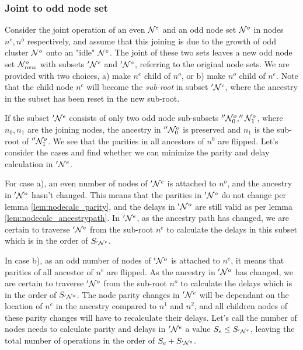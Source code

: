 \subsubsection{Joint to odd node set}

Consider the joint operation of an even $\mathcal{N}^e$ and an odd node set $\mathcal{N}^o$ in nodes $n^e, n^o$ respectively, and assume that this joining is due to the growth of odd cluster $\mathcal{N}^o$ onto an "idle" $\mathcal{N}^e$. The joint of these two sets leaves a new odd node set $\mathcal{N}_{new}^o$ with subsets $'\mathcal{N}^e$ and $'\mathcal{N}^o$, referring to the original node sets. We are provided with two choices, a) make $n^e$ child of $n^o$, or b) make $n^o$ child of $n^e$. Note that the child node $n^c$ will become the \emph{sub-root} in subset $'\mathcal{N}^c$, where the ancestry in the subset has been reset in the new sub-root.

If the subset $'\mathcal{N}^e$ consists of only two odd node sub-subsets $''\mathcal{N}^o_0, ''\mathcal{N}^o_1$, where $n_0, n_1$ are the joining nodes, the ancestry in $''\mathcal{N}^o_0$ is preserved and $n_1$ is the sub-root of $''\mathcal{N}^o_1$. We see that the parities in all ancestors of $n^0$ are flipped. Let's consider the cases and find whether we can minimize the parity and delay calculation in $'\mathcal{N}^{e}$.

For case a), an even number of nodes of $'\mathcal{N}^e$ is attached to $n^o$, and the ancestry in $'\mathcal{N}^o$ hasn't changed. This means that the parities in $'\mathcal{N}^o$ do not change per lemma \ref{lem:nodecalc_parity}, and the delays in $'\mathcal{N}^o$ are still valid as per lemma \ref{lem:nodecalc_ancestrypath}. In $'\mathcal{N}^e$, as the ancestry path has changed, we are certain to traverse $'\mathcal{N}^e$ from the sub-root $n^e$ to calculate the delays in this subset which is in the order of $S_{'\mathcal{N}^e}$.

In case b), as an odd number of nodes of $'\mathcal{N}^o$ is attached to $n^e$, it means that parities of all ancestor of $n^e$ are flipped. As the ancestry in $'\mathcal{N}^{o}$ has changed, we are certain to traverse $'\mathcal{N}^o$ from the sub-root $n^o$ to calculate the delays which is in the order of $S_{'\mathcal{N}^o}$. The node parity changes in $'\mathcal{N}^e$ will be dependant on the location of $n^e$ in the ancestry compared to $n^1$ and $n^2$, and all children nodes of these parity changes will have to recalculate their delays. Let's call the number of nodes needs to calculate parity and delays in $'\mathcal{N}^e$ a value $S_e \leq S_{'\mathcal{N}^e}$, leaving the total number of operations in the order of $S_e + S_{'\mathcal{N}^o}$.

